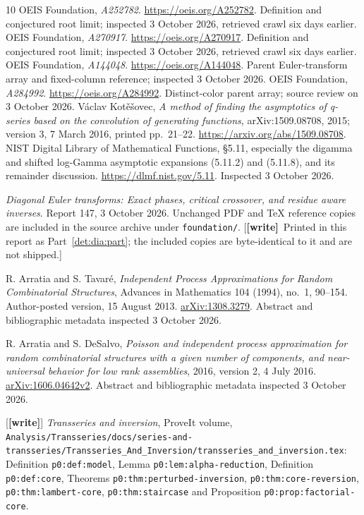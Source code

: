 \documentclass[11pt,letterpaper]{article}
\numberwithin{equation}{section}
\theoremstyle{definition}\newtheorem{definition}[theorem]{Definition}
\theoremstyle{remark}\newtheorem{remark}[theorem]{Remark}
\newcommand{\file}[1]{\nolinkurl{#1}}
\newcommand{\wtag}{\textup{\textbf{[write]}}}
\begin{document}
\begin{thebibliography}{10}
 OEIS Foundation, \emph{A252782}.
\url{https://oeis.org/A252782}. Definition and conjectured root limit;
inspected 3 October 2026, retrieved crawl six days earlier.
 OEIS Foundation, \emph{A270917}.
\url{https://oeis.org/A270917}. Definition and conjectured root limit;
inspected 3 October 2026, retrieved crawl six days earlier.
 OEIS Foundation, \emph{A144048}.
\url{https://oeis.org/A144048}. Parent Euler-transform array and
fixed-column reference; inspected 3 October 2026.
 OEIS Foundation, \emph{A284992}.
\url{https://oeis.org/A284992}. Distinct-color parent array;
source review on 3 October 2026.
 V\'aclav Kot\v e\v sovec,
\emph{A method of finding the asymptotics of q-series based on the
convolution of generating functions}, arXiv:1509.08708, 2015;
version 3, 7 March 2016, printed pp.~21--22.
\url{https://arxiv.org/abs/1509.08708}.
 NIST Digital Library of Mathematical Functions,
\S5.11, especially the digamma and shifted log-Gamma asymptotic
expansions (5.11.2) and (5.11.8), and its remainder discussion.
\url{https://dlmf.nist.gov/5.11}. Inspected 3 October 2026.

\emph{Diagonal Euler transforms: Exact phases, critical crossover, and
residue aware inverses}. Report 147, 3 October 2026.
Unchanged PDF and TeX reference copies are included in the source
archive under \texttt{foundation/}.
[\wtag\ Printed in this report as Part~\ref{det:dia:part}; the included copies are byte-identical to it and are not shipped.]

R. Arratia and S. Tavar\'e,
\emph{Independent Process Approximations for Random Combinatorial
Structures}, Advances in Mathematics 104 (1994), no.~1, 90--154.
Author-posted version, 15 August 2013.
\href{https://arxiv.org/abs/1308.3279}{arXiv:1308.3279}.
Abstract and bibliographic metadata inspected 3 October 2026.

R. Arratia and S. DeSalvo,
\emph{Poisson and independent process approximation for random
combinatorial structures with a given number of components, and
near-universal behavior for low rank assemblies}, 2016, version 2,
4 July 2016.
\href{https://arxiv.org/abs/1606.04642v2}{arXiv:1606.04642v2}.
Abstract and bibliographic metadata inspected 3 October 2026.

 [\wtag] \emph{Transseries and inversion}, ProveIt volume,
\file{Analysis/Transseries/docs/series-and-transseries/Transseries_And_Inversion/transseries_and_inversion.tex}:
Definition \file{p0:def:model}, Lemma \file{p0:lem:alpha-reduction},
Definition \file{p0:def:core}, Theorems \file{p0:thm:perturbed-inversion},
\file{p0:thm:core-reversion}, \file{p0:thm:lambert-core},
\file{p0:thm:staircase} and Proposition \file{p0:prop:factorial-core}.
\end{thebibliography}
\end{document}
